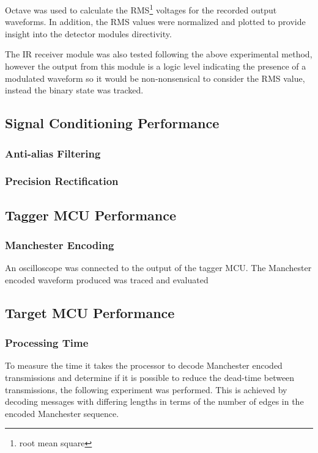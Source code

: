 Octave was used to calculate the RMS\footnote{root mean square} voltages for the recorded output waveforms. In addition, the RMS values were normalized and plotted to provide insight into the detector modules directivity.

The IR receiver module was also tested following the above experimental method, however the output from this module is a logic level indicating the presence of a modulated waveform so it would be non-nonsensical to consider the RMS value, instead the binary state was tracked.

\subsection{Signal Conditioning Performance}

\subsubsection{Anti-alias Filtering}

\subsubsection{Precision Rectification}


\subsection{Tagger MCU Performance}

\subsubsection{Manchester Encoding}

An oscilloscope was connected to the output of the tagger MCU. The Manchester encoded waveform produced was traced and evaluated %


\subsection{Target MCU Performance}

\subsubsection{Processing Time}

To measure the time it takes the processor to decode Manchester encoded transmissions and determine if it is possible to reduce the dead-time between transmissions, the following experiment was performed. This is achieved by decoding messages with differing lengths in terms of the number of edges in the encoded Manchester sequence.

